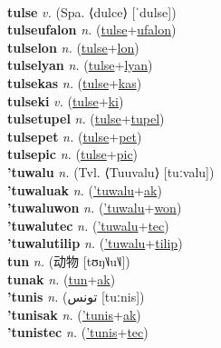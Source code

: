  \label{tulum} \\
\textbf{tulse} \textit{v.} (Spa. ⟨dulce⟩ [ˈdulse])
 \label{tulse} \\
\textbf{tulseufalon} \textit{n.} (\hyperref[tulse]{tulse}+\hyperref[ufalon]{ufalon})
 \label{tulseufalon} \\
\textbf{tulselon} \textit{n.} (\hyperref[tulse]{tulse}+\hyperref[lon]{lon})
 \label{tulselon} \\
\textbf{tulselyan} \textit{n.} (\hyperref[tulse]{tulse}+\hyperref[lyan]{lyan})
 \label{tulselyan} \\
\textbf{tulsekas} \textit{n.} (\hyperref[tulse]{tulse}+\hyperref[kas]{kas})
 \label{tulsekas} \\
\textbf{tulseki} \textit{v.} (\hyperref[tulse]{tulse}+\hyperref[ki]{ki})
 \label{tulseki} \\
\textbf{tulsetupel} \textit{n.} (\hyperref[tulse]{tulse}+\hyperref[tupel]{tupel})
 \label{tulsetupel} \\
\textbf{tulsepet} \textit{n.} (\hyperref[tulse]{tulse}+\hyperref[pet]{pet})
 \label{tulsepet} \\
\textbf{tulsepic} \textit{n.} (\hyperref[tulse]{tulse}+\hyperref[pic]{pic})
 \label{tulsepic} \\
\textbf{'tuwalu} \textit{n.} (Tvl. ⟨Tuuvalu⟩ [tuːvalu])
 \label{'tuwalu} \\
\textbf{'tuwaluak} \textit{n.} (\hyperref['tuwalu]{'tuwalu}+\hyperref[ak]{ak})
 \label{'tuwaluak} \\
\textbf{'tuwaluwon} \textit{n.} (\hyperref['tuwalu]{'tuwalu}+\hyperref[won]{won})
 \label{'tuwaluwon} \\
\textbf{'tuwalutec} \textit{n.} (\hyperref['tuwalu]{'tuwalu}+\hyperref[tec]{tec})
 \label{'tuwalutec} \\
\textbf{'tuwalutilip} \textit{n.} (\hyperref['tuwalu]{'tuwalu}+\hyperref[tilip]{tilip})
 \label{'tuwalutilip} \\
\textbf{tun} \textit{n.} ({\chinese{}动物} [tʊŋ˥˩u˥˩])
 \label{tun} \\
\textbf{tunak} \textit{n.} (\hyperref[tun]{tun}+\hyperref[ak]{ak})
 \label{tunak} \\
\textbf{'tunis} \textit{n.} ({\arabics{}تونس} [tuːnis])
 \label{'tunis} \\
\textbf{'tunisak} \textit{n.} (\hyperref['tunis]{'tunis}+\hyperref[ak]{ak})
 \label{'tunisak} \\
\textbf{'tunistec} \textit{n.} (\hyperref['tunis]{'tunis}+\hyperref[tec]{tec})
 \label{'tunistec} \\
